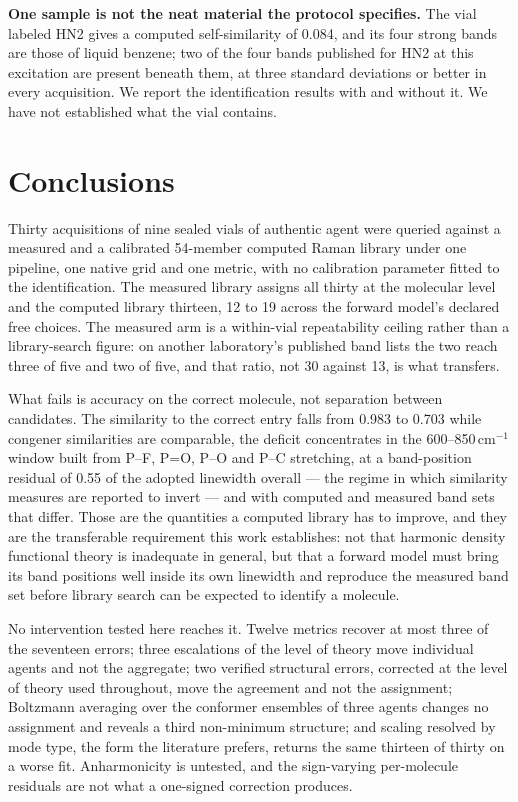 \documentclass[review,12pt]{elsarticle}
\newcommand*\wn{\ensuremath{\text{cm}^{-1}}}
\begin{document}
\textbf{One sample is not the neat material the protocol specifies.} The vial labeled HN2 gives a computed self-similarity of 0.084, and its four strong bands are those of liquid benzene; two of the four bands published for HN2 at this excitation are present beneath them, at three standard deviations or better in every acquisition.
We report the identification results with and without it. We have not established what
the vial contains.


\section{Conclusions}

Thirty acquisitions of nine sealed vials of authentic agent were queried against a measured
and a calibrated 54-member computed Raman library under one pipeline, one native grid and
one metric, with no calibration parameter fitted to the identification. The measured
library assigns all thirty at the molecular level and the computed library thirteen, 12 to
19 across the forward model's declared free choices. The measured arm is a within-vial
repeatability ceiling rather than a library-search figure: on another laboratory's
published band lists the two reach three of five and two of five, and that ratio, not
30 against 13, is what transfers.

What fails is accuracy on the correct molecule, not separation between candidates. The
similarity to the correct entry falls from 0.983 to 0.703 while congener similarities are
comparable, the deficit concentrates in the 600--850\,\wn{} window built from P--F, P=O,
P--O and P--C stretching, at a band-position residual of 0.55 of the adopted linewidth overall --- the regime in which similarity measures are reported to invert --- and with computed and measured band sets that differ. Those are the quantities a computed library has to improve, and they are the transferable requirement this work establishes: not that harmonic density functional theory is inadequate in general, but that a forward model must bring its band positions well inside its own linewidth and reproduce the measured band set before library search can be expected to identify a molecule.

No intervention tested here reaches it. Twelve metrics recover at most three of the
seventeen errors; three escalations of the level of theory move individual agents and not
the aggregate; two verified structural errors, corrected at the level of theory used
throughout, move the agreement and not the assignment; Boltzmann averaging over the
conformer ensembles of three agents changes no assignment and reveals a third non-minimum
structure; and scaling resolved by mode type, the form the literature prefers, returns the
same thirteen of thirty on a worse fit. Anharmonicity is untested, and the sign-varying
per-molecule residuals are not what a one-signed correction produces.
\end{document}

